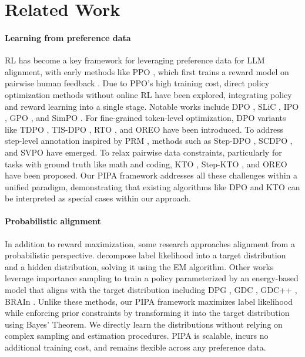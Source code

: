 \section{Related Work}
\paragraph{Learning from preference data}
RL has become a key framework for leveraging preference data for LLM alignment, with early methods like PPO \citep{schulman2017proximal}, which first trains a reward model on pairwise human feedback \citep{ouyang2022training}. Due to PPO’s high training cost, direct policy optimization methods without online RL have been explored, integrating policy and reward learning into a single stage. Notable works include DPO \citep{rafailov2024direct}, SLiC \citep{zhao2023slic}, IPO \citep{IPO}, GPO \citep{tang2024generalized}, and SimPO \citep{meng2024simpo}.
For fine-grained token-level optimization, DPO variants like TDPO \citep{zeng2024token}, TIS-DPO \citep{liu2024tis}, RTO \citep{rto}, and OREO \citep{oreo} have been introduced. To address step-level annotation inspired by PRM \citep{lightman2023let}, methods such as Step-DPO \citep{Step-dpo}, SCDPO \citep{stepcontroldpo}, and SVPO \citep{svpo} have emerged. To relax pairwise data constraints, particularly for tasks with ground truth like math and coding, KTO \citep{ethayarajh2024kto}, Step-KTO  \citep{stepkto}, and OREO \citep{oreo} have been proposed. 
Our PIPA framework addresses all these challenges within a unified paradigm, demonstrating that existing algorithms like DPO and KTO can be interpreted as special cases within our approach.

\paragraph{Probabilistic alignment}
In addition to reward maximization, some research approaches alignment from a probabilistic perspective. \citep{probabilistic} decompose label likelihood into a target distribution and a hidden distribution, solving it using the EM algorithm. Other works leverage importance sampling to train a policy parameterized by an energy-based model that aligns with the target distribution including DPG \citep{dpg}, GDC \citep{gdc}, GDC++ \citep{gdc++}, BRAIn \citep{pandey2024brain}.
Unlike these methods, our PIPA framework maximizes label likelihood while enforcing prior constraints by transforming it into the target distribution using Bayes' Theorem. We directly learn the distributions without relying on complex sampling and estimation procedures. PIPA is scalable, incurs no additional training cost, and remains flexible across any preference data.